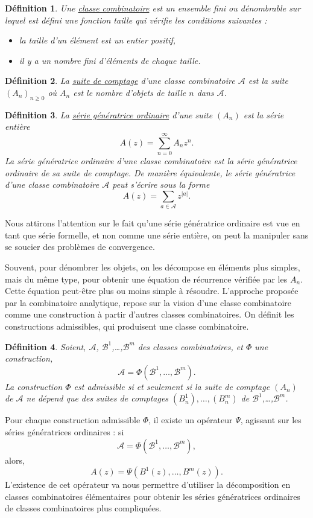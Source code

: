 \documentclass[12pt]{report}
\newtheorem*{definition}{Définition}
\begin{document}
\begin{definition}
  Une \underline{classe combinatoire} est un ensemble fini ou dénombrable sur lequel est défini une fonction taille qui vérifie les conditions suivantes : 
  \begin{itemize}
    \item la taille d'un élément est un entier positif,
    \item il y a un nombre fini d'éléments de chaque taille.
  \end{itemize}
\end{definition}

\begin{definition}
La \underline{suite de comptage} d'une classe combinatoire $\mathcal A$ est la suite $(A_n)_{n \geqslant 0}$ où $A_n$ est le nombre d'objets de taille $n$ dans $\mathcal A$.
\end{definition}


\begin{definition}
  La \underline{série génératrice ordinaire} d'une suite $(A_n)$ est la série entière
  $$A(z) = \sum_{n=0}^{\infty} A_n z^n .$$
  La série génératrice ordinaire d'une classe combinatoire est la série génératrice ordinaire de sa suite de comptage. De manière équivalente, le série génératrice d'une classe combinatoire $\mathcal A$ peut s'écrire sous la forme 
  $$A(z) = \sum_{a \in \mathcal A} z ^{|a|} .$$
\end{definition}
Nous attirons l'attention sur le fait qu'une série génératrice ordinaire est vue en tant que série formelle, et non comme une série entière, on peut la manipuler sans se soucier des problèmes de convergence.

Souvent, pour dénombrer les objets, on les décompose en éléments plus simples, mais du même type, pour obtenir une équation de récurrence vérifiée par les $A_n$. Cette équation peut-être plus ou moins simple à résoudre.
L'approche proposée par la combinatoire analytique\cite{flajolet}, repose sur la vision d'une classe combinatoire comme une construction à partir d'autres classes combinatoires. 
On définit les  constructions admissibles, qui produisent une classe combinatoire. 
\begin{definition}Soient, $\mathcal A$, $\mathcal B^{1}$,\dots,$\mathcal B^{m}$ des classes combinatoires, et $\Phi$ une construction, 
$$\mathcal A = \Phi(\mathcal B^{1},\dots,\mathcal B^{m}).$$
La construction $\Phi$ est admissible si et seulement si la suite de comptage $(A_n)$  de $\mathcal A$ ne dépend que des suites de comptages $(B_n^{1}),\dots, (B_n^{m})$ de $\mathcal B^{1}$,\dots,$\mathcal B^{m}$.
\end{definition}
Pour chaque construction admissible $\Phi$, il existe un opérateur $\Psi$, agissant sur les séries génératrices ordinaires : si
$$\mathcal A = \Phi(\mathcal B^{1},\dots,\mathcal B^{m}),$$
alors, 
$$A(z) = \Psi(B^1(z),\dots, B^m(z)).$$
L'existence de cet opérateur va nous permettre d'utiliser la décomposition en classes combinatoires élémentaires pour obtenir les séries génératrices ordinaires de classes combinatoires plus compliquées.
\end{document}
